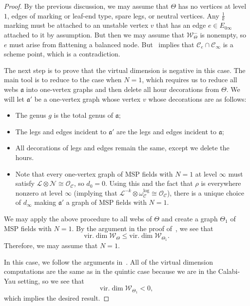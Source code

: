 \documentclass{amsart}
\theoremstyle{definition}
\theoremstyle{remark}
\theoremstyle{plain}
\theoremstyle{definition}
\theoremstyle{remark}
\newcommand{\mc}[1]{\mathcal{#1}}
\newcommand{\mf}[1]{\mathfrak{#1}}
\newcommand{\mr}[1]{\mathrm{#1}}
\newcommand{\1}{\mathbf{1}}
\newcommand{\2}{\mathbf{2}}
\newcommand{\3}{\mathbf{3}}
\newcommand{\vir}{\mr{vir}}
\begin{document}
\begin{proof}
    By the previous discussion, we may assume that $\Theta$ has no vertices at level $1$, edges of marking or leaf-end type, spare legs, or neutral vertices. Any $\frac{1}{k}$ marking must be attached to an unstable vertex $v$ that has an edge $e \in E_{0\infty}$ attached to it by assumption. But then we may assume that $\mc{W}_{\Theta}^-$ is nonempty, so $e$ must arise from flattening a balanced node. But~ implies that $\mc{C}_e \cap \mc{C}_{\infty}$ is a scheme point, which is a contradiction.

    The next step is to prove that the virtual dimension is negative in this case. The main tool is to reduce to the case when $N = 1$, which requires us to reduce all webs $\mf{a}$ into one-vertex graphs and then delete all hour decorations from $\Theta$. We will let $\mf{a}'$ be a one-vertex graph whose vertex $v$ whose decorations are as follows:
    \begin{itemize}
        \item The genus $g$ is the total genus of $\mf{a}$;
        \item The legs and edges incident to $\mf{a}'$ are the legs and edges incident to $\mf{a}$;
        \item All decorations of legs and edges remain the same, except we delete the hours.
        \item Note that every one-vertex graph of MSP fields with $N=1$ at level $\infty$ must satisfy $\mc{L} \otimes \mc{N} \cong \mc{O}_{\mc{C}}$, so $d_0 = 0$. Using this and the fact that $\rho$ is everywhere nonzero at level $\infty$ (implying that $\mc{L}^{-k} \otimes \omega_{\mc{C}}^{\log} \cong \mc{O}_{\mc{C}}$), there is a unique choice of $d_{\infty}$ making $\mf{a}'$ a graph of MSP fields with $N=1$.
    \end{itemize}

    We may apply the above procedure to all webs of $\Theta$ and create a graph $\Theta_1$ of MSP fields with $N=1$. By the argument in the proof of~\cite[Lemma 5.12]{nmsp}, we see that
    \[ \vir.\dim \mc{W}_{\Theta} \leq \vir.\dim \mc{W}_{\Theta_1}. \]
    Therefore, we may assume that $N=1$.

    In this case, we follow the arguments in~\cite[\S 4]{msp3}. All of the virtual dimension computations are the same as in the quintic case because we are in the Calabi-Yau setting, so we see that
    \[ \vir.\dim \mc{W}_{\Theta_1} < 0, \]
    which implies the desired result.
\end{proof}
\end{document}
